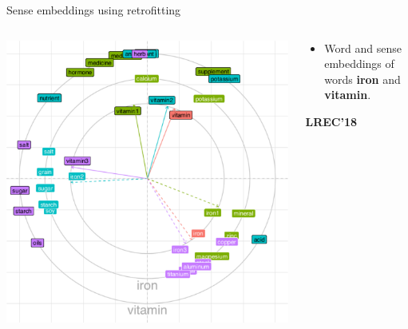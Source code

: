 \begin{frame}{Sense embeddings using retrofitting}
\vspace{-1em}
\begin{columns}
\begin{column}{0.55\textwidth}
\includegraphics[height=0.68\textheight]{bullseye}
\end{column}

\begin{column}{.45\textwidth}
{ \footnotesize

\begin{itemize}

\item Word and sense embeddings of words \textbf{iron} and  \textbf{vitamin}.

\end{itemize}

\textbf{LREC'18}~\cite{remus:2018}

}
\end{column}
\end{columns}

\end{frame}

